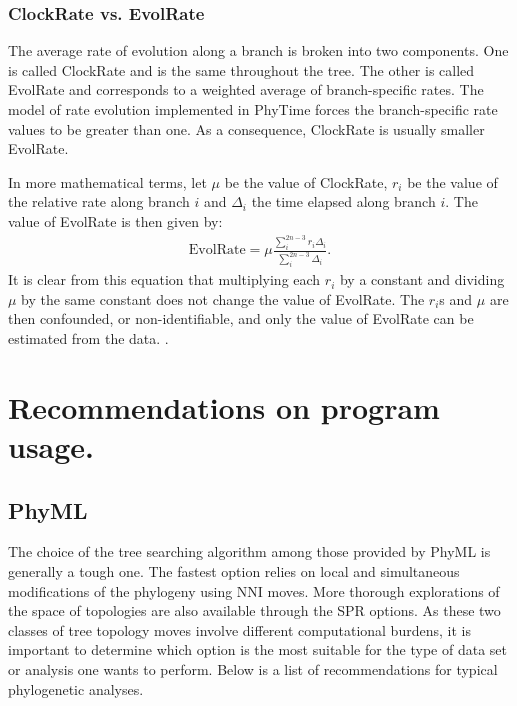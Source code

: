 \documentclass[a4paper,12pt]{article}
\begin{document}
\subsubsection{ClockRate vs. EvolRate}

The average rate of evolution along a branch  is broken into two components. One is called ClockRate
and is  the same throughout  the tree. The  other is called EvolRate  and corresponds to  a weighted
average of  branch-specific rates.  The  model of rate  evolution implemented in PhyTime  forces the
branch-specific rate values to  be greater than one. As a consequence,  ClockRate is usually smaller
EvolRate.

In more mathematical terms, let $\mu$ be the value of ClockRate, $r_i$ be the value of the relative
rate along branch $i$ and $\Delta_i$ the time elapsed along branch $i$. The value of EvolRate is
then given by:
\begin{eqnarray*}
\mathrm{EvolRate} = \mu \frac{\sum_{i}^{2n-3} r_i \Delta_i}{\sum_{i}^{2n-3} \Delta_i}.
\end{eqnarray*}  It is  clear from  this equation  that  multiplying each  $r_i$ by  a constant  and
dividing $\mu$ by the same constant does not  change the value of EvolRate. The $r_i$s and $\mu$
are then confounded,  or non-identifiable, and only  the value of EvolRate can  be estimated from
the data.   {\color{red}{Please make sure  that you use  the value of  EvolRate rather than  that of
ClockRate when referring to the estimate of the substitution rate}}.




\section{Recommendations on program usage.}\label{sec:progusage}

\subsection{PhyML}

The choice of the  tree searching algorithm among those provided by PhyML  is generally a tough one.
The  fastest option  relies  on local  and simultaneous  modifications  of the  phylogeny using  NNI
moves. More  thorough explorations of  the space  of topologies are  also available through  the SPR
options.  As these  two classes of tree topology moves involve  different computational burdens, it
is important to determine which option is the most suitable for the type of data set or analysis one
wants to perform. Below is a list of recommendations for typical phylogenetic analyses.
\end{document}
